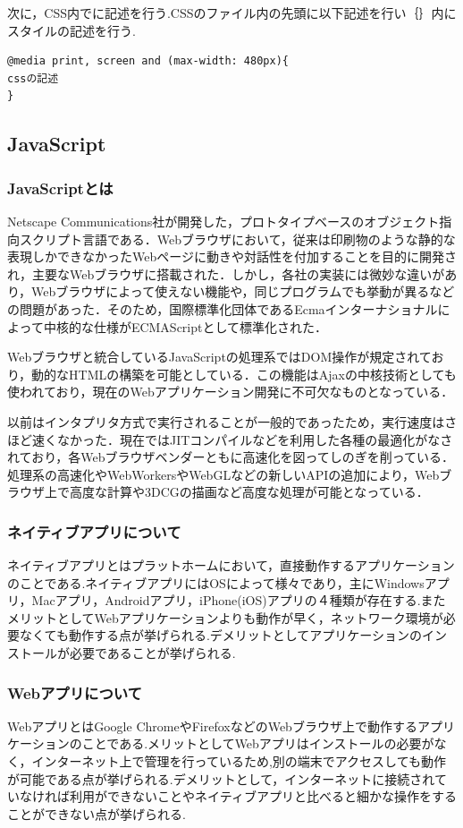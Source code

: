 \documentclass[a4j,12pt]{jarticle}
\begin{document}
次に，CSS内でに記述を行う.CSSのファイル内の先頭に以下記述を行い｛｝内にスタイルの記述を行う.
\begin{lstlisting}[caption=CSSの記述例,label=s3]
@media print, screen and (max-width: 480px){
cssの記述
}
\end{lstlisting}

\subsection{JavaScript}
\subsubsection{JavaScriptとは}
Netscape Communications社が開発した，プロトタイプベースのオブジェクト指向スクリプト言語である．Webブラウザにおいて，従来は印刷物のような静的な表現しかできなかったWebページに動きや対話性を付加することを目的に開発され，主要なWebブラウザに搭載された．しかし，各社の実装には微妙な違いがあり，Webブラウザによって使えない機能や，同じプログラムでも挙動が異るなどの問題があった．そのため，国際標準化団体であるEcmaインターナショナルによって中核的な仕様がECMAScriptとして標準化された．

Webブラウザと統合しているJavaScriptの処理系ではDOM操作が規定されており，動的なHTMLの構築を可能としている．この機能はAjaxの中核技術としても使われており，現在のWebアプリケーション開発に不可欠なものとなっている．

以前はインタプリタ方式で実行されることが一般的であったため，実行速度はさほど速くなかった．現在ではJITコンパイルなどを利用した各種の最適化がなされており，各Webブラウザベンダーともに高速化を図ってしのぎを削っている．
処理系の高速化やWebWorkersやWebGLなどの新しいAPIの追加により，Webブラウザ上で高度な計算や3DCGの描画など高度な処理が可能となっている\cite{ren9}．

\subsubsection{ネイティブアプリについて}
ネイティブアプリとはプラットホームにおいて，直接動作するアプリケーションのことである.ネイティブアプリにはOSによって様々であり，主にWindowsアプリ，Macアプリ，Androidアプリ，iPhone(iOS)アプリの４種類が存在する.またメリットとしてWebアプリケーションよりも動作が早く，ネットワーク環境が必要なくても動作する点が挙げられる.デメリットとしてアプリケーションのインストールが必要であることが挙げられる.


\subsubsection{Webアプリについて}
WebアプリとはGoogle ChromeやFirefoxなどのWebブラウザ上で動作するアプリケーションのことである.メリットとしてWebアプリはインストールの必要がなく，インターネット上で管理を行っているため,別の端末でアクセスしても動作が可能である点が挙げられる.デメリットとして，インターネットに接続されていなければ利用ができないことやネイティブアプリと比べると細かな操作をすることができない点が挙げられる.
\newpage
\end{document}
